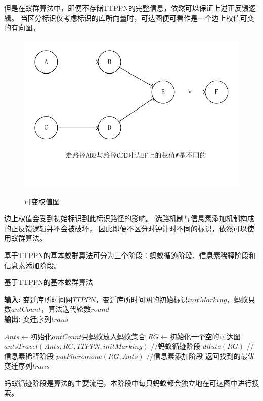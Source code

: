 但是在蚁群算法中，即便不存储TTPPN的完整信息，依然可以保证上述正反馈逻辑。
当区分标识仅考虑标识的库所向量时，可达图便可看作是一个边上权值可变的有向图。
\begin{figure}[H]
	\centering
	\includegraphics[scale=0.7,angle=0]{figures/可变权值图.pdf}\\
	\caption{可变权值图}
\end{figure}
边上权值会受到初始标识到此标识路径的影响。
选路机制与信息素添加机制构成的正反馈逻辑并不会被破坏，
因此即便不区分时钟计时不同的标识，依然可以使用蚁群算法。

基于TTPPN的基本蚁群算法可分为三个阶段：蚂蚁循迹阶段、信息素稀释阶段和信息素添加阶段。

\begin{algorithm}[H]
    \caption{基于TTPPN的基本蚁群算法}
    \hspace*{0.02in} {\bf 输入:} 
    变迁库所时间网$TTPPN$，变迁库所时间网的初始标识$initMarking$，蚂蚁只数$antCount$，算法迭代轮数$round$\\
    \hspace*{0.02in} {\bf 输出:}
	变迁序列$trans$
    \begin{algorithmic}[1]
			\State $Ants \leftarrow$初始化$antCount$只蚂蚁放入蚂蚁集合
			\State $RG \leftarrow$初始化一个空的可达图
			\State $antsTravel(Ants,RG,TTPPN,initMarking)$ //蚂蚁循迹阶段
			\State $dilute(RG)$ //信息素稀释阶段
			\State $putPheromone(RG,Ants)$ //信息素添加阶段
		\EndFor
		\State 返回找到的最优变迁序列$trans$
    \end{algorithmic}
\end{algorithm}

蚂蚁循迹阶段是算法的主要流程，本阶段中每只蚂蚁都会独立地在可达图中进行搜索。

